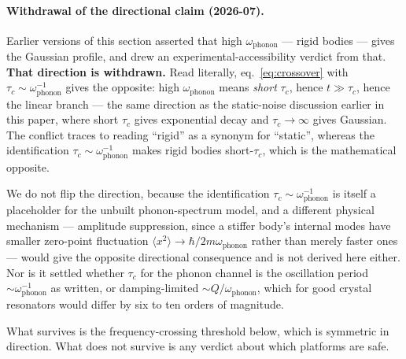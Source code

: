 \documentclass[12pt,a4paper]{article}
\theoremstyle{remark}
\begin{document}
\paragraph{Withdrawal of the directional claim (2026-07).} Earlier versions of this
section asserted that high $\omega_{\text{phonon}}$ --- rigid bodies --- gives the
Gaussian profile, and drew an experimental-accessibility verdict from that. \textbf{That
direction is withdrawn.} Read literally, eq.~\eqref{eq:crossover} with $\tau_c \sim
\omega_{\text{phonon}}^{-1}$ gives the opposite: high $\omega_{\text{phonon}}$ means
\emph{short} $\tau_c$, hence $t \gg \tau_c$, hence the linear branch --- the same
direction as the static-noise discussion earlier in this paper, where short $\tau_c$ gives
exponential decay and $\tau_c\to\infty$ gives Gaussian. The conflict traces to reading
``rigid'' as a synonym for ``static'', whereas the identification $\tau_c \sim
\omega_{\text{phonon}}^{-1}$ makes rigid bodies short-$\tau_c$, which is the mathematical
opposite.

We do not flip the direction, because the identification $\tau_c \sim
\omega_{\text{phonon}}^{-1}$ is itself a placeholder for the unbuilt phonon-spectrum
model, and a different physical mechanism --- amplitude suppression, since a stiffer body's
internal modes have smaller zero-point fluctuation $\langle x^2\rangle \to
\hbar/2m\omega_{\text{phonon}}$ rather than merely faster ones --- would give the opposite
directional consequence and is not derived here either. Nor is it settled whether $\tau_c$
for the phonon channel is the oscillation period $\sim\omega_{\text{phonon}}^{-1}$ as
written, or damping-limited $\sim Q/\omega_{\text{phonon}}$, which for good crystal
resonators would differ by six to ten orders of magnitude.

What survives is the frequency-crossing threshold below, which is symmetric in direction.
What does not survive is any verdict about which platforms are safe.
\end{document}
